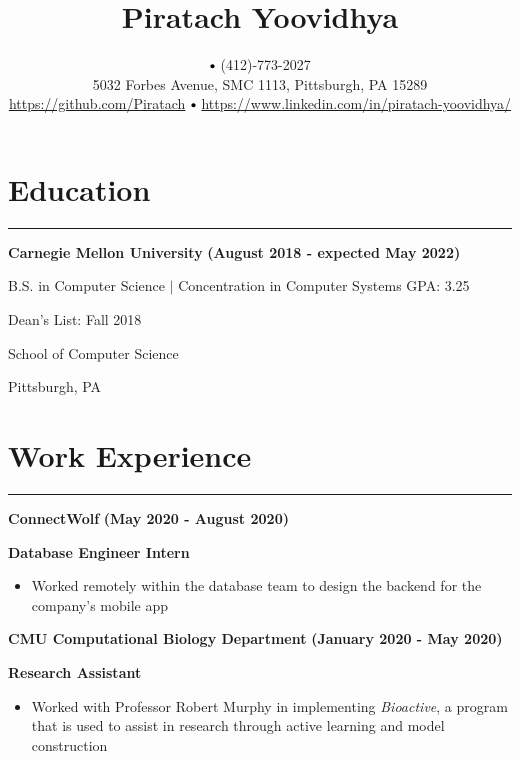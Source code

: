 \documentclass[10pt]{article}
\title{\bfseries\Huge Piratach Yoovidhya}
\author{
  \myemail
   $\sbullet[.75]$
  (412)-773-2027 \\
  5032 Forbes Avenue, SMC 1113, Pittsburgh, PA 15289 \\
  \href{https://github.com/Piratach}{https://github.com/Piratach}
   $\sbullet[.75]$
  \href{https://www.linkedin.com/in/piratach-yoovidhya/}
  {https://www.linkedin.com/in/piratach-yoovidhya/}
  }
\date{}
\begin{document}
  \maketitle
  \thispagestyle{empty}

  \vspace*{-1.4cm}
  \section*{\LARGE Education}
  \vspace*{-0.1cm}
  \hrule depth 0.2mm \relax
  \vspace{0.2cm}
  \textbf{\large Carnegie Mellon University} \hfill \textbf{(August 2018 - expected May 2022)}

  B.S. in Computer Science $\mid$ Concentration in Computer Systems \hfill GPA: 3.25

  Dean's List: Fall 2018

  School of Computer Science

  Pittsburgh, PA

  \vspace*{-0.4cm}
  \section*{\LARGE Work Experience}
  \vspace*{-0.1cm}
  \hrule depth 0.2mm \relax
  \vspace{0.2cm}
  \textbf{\large ConnectWolf} \hfill \textbf{(May 2020 - August 2020)}

  \textbf{Database Engineer Intern}
  \vspace*{-0.25cm}
  \begin{itemize}
    \item Worked remotely within the database team to design the backend for the company's mobile app
  \end{itemize}


  \textbf{\large CMU Computational Biology Department} \hfill \textbf{(January 2020 - May 2020)}

  \textbf{Research Assistant}

  \vspace*{-0.25cm}
  \begin{itemize}
    \item Worked with Professor Robert Murphy in implementing \textit{Bioactive}, a program that is used to assist in research through active learning and model construction
  \end{itemize}
\end{document}
